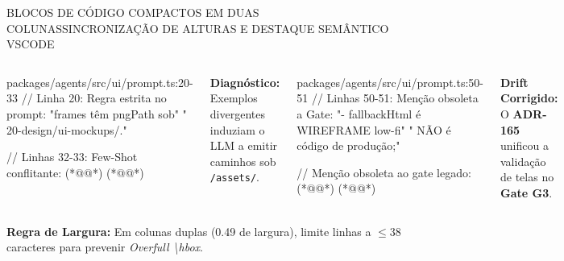\documentclass[aspectratio=169,t,xcolor=table]{beamer}
\begin{document}
\begin{frame}[fragile]{BLOCOS DE CÓDIGO COMPACTOS EM DUAS COLUNAS}{SINCRONIZAÇÃO DE ALTURAS E DESTAQUE SEMÂNTICO VSCODE}
    \vspace{-0.4em}
    \begin{columns}[T]
        \begin{ceiacodecompact}[equal height group=code_demo]{packages/agents/src/ui/prompt.ts:20-33}
// Linha 20: Regra estrita no prompt:
"frames têm pngPath sob"
"  20-design/ui-mockups/."

// Linhas 32-33: Few-Shot conflitante:
(*@@*)
(*@@*)
        \end{ceiacodecompact}
        \vspace{0.3em}
        {\scriptsize\textbf{Diagnóstico:} Exemplos divergentes induziam o LLM a emitir caminhos sob \texttt{/assets/}.}

        \begin{ceiacodecompact}[equal height group=code_demo]{packages/agents/src/ui/prompt.ts:50-51}
// Linhas 50-51: Menção obsoleta a Gate:
"- fallbackHtml é WIREFRAME low-fi"
"  NÃO é código de produção;"

// Menção obsoleta ao gate legado:
(*@@*)
(*@@*)
        \end{ceiacodecompact}
        \vspace{0.3em}
        {\scriptsize\textbf{Drift Corrigido:} O \textbf{ADR-165} unificou a validação de telas no \textbf{Gate G3}.}
    \end{columns}
    \vspace{0.3em}
    {\tiny\color{CEIATextMuted}\textbf{Regra de Largura:} Em colunas duplas (0.49 de largura), limite linhas a $\le 38$ caracteres para prevenir \textit{Overfull \textbackslash hbox}.}
\end{frame}
\end{document}
